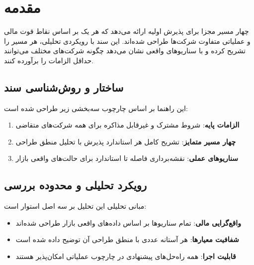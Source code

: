 \documentclass[10pt]{report}
\newcommand{\lat}[1]{\lr{#1}}
\begin{document}
\clearpage
\hypertarget{home}{}
\tableofcontents

\clearpage
\chapter*{مقدمه}

\begin{keyconceptbox}
\lat{Nasdaq Global Market} چهار مسیر مجزا برای پذیرش اولیه ارائه می‌دهد که هر یک بر اساس نقاط قوت مالی و عملیاتی متفاوت شرکت‌ها طراحی شده‌اند. این سند با رویکردی تحلیلی، هر مسیر را تشریح کرده و با سناریوهای واقعی نشان می‌دهد چگونه شرکت‌های مختلف می‌توانند حداقل الزامات را برآورده کنند.
\end{keyconceptbox}

\section*{ساختار و روش‌شناسی سند}

این راهنما بر اساس چارچوب سه‌بخشی زیر طراحی شده است:

\begin{enumerate}[rightmargin=1.5cm]
\item \textbf{الزامات پایه}: شروط مشترک و غیرقابل مذاکره برای همه شرکت‌های متقاضی
\item \textbf{چهار مسیر متمایز}: تشریح کامل هر استاندارد پذیرش با تحلیل منطق طراحی
\item \textbf{سناریوهای عملی}: نقشه‌برداری فاصله تا استاندارد برای حالت‌های واقعی بازار
\end{enumerate}

\section*{رویکرد تحلیلی و محدوده بررسی}

\begin{principlebox}{مبانی تحلیلی}
این تحلیل بر سه اصل استوار است:
\begin{itemize}[rightmargin=1.5cm]
\item \textbf{واقع‌گرایی مالی}: تمام سناریوها بر اساس داده‌های واقعی بازار طراحی شده‌اند
\item \textbf{شفافیت معیارها}: هر آستانه عددی با منطق طراحی آن توضیح داده شده است
\item \textbf{قابلیت اجرا}: همه راه‌حل‌های پیشنهادی در چارچوب عملیاتی امکان‌پذیر هستند
\end{itemize}
\end{principlebox}
\end{document}
